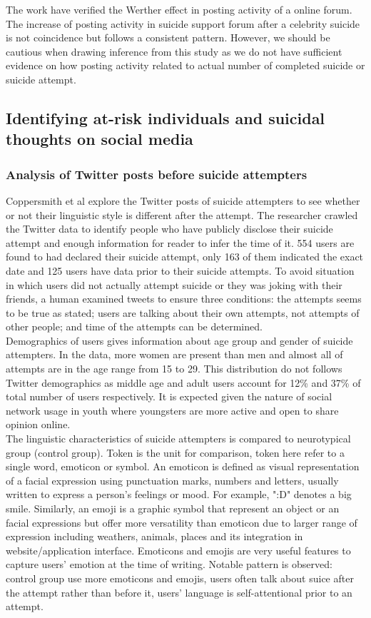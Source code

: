 The work have verified the Werther effect in posting activity of a online forum. The increase of posting activity in suicide support forum after a celebrity suicide is not coincidence but follows a consistent pattern. However, we should be cautious when drawing inference from this study as we do not have sufficient evidence on how posting activity related to actual number of completed suicide or suicide attempt.\\

\subsection{Identifying at-risk individuals and suicidal thoughts on social media}
\subsubsection*{Analysis of Twitter posts before suicide attempters}
Coppersmith et al \cite{Coppersmith2016} explore the Twitter posts of suicide attempters to see whether or not their linguistic style is different after the attempt. The researcher crawled the Twitter data to identify people who have publicly disclose their suicide attempt and enough information for reader to infer the time of it. 554 users are found to had declared their suicide attempt, only 163 of them indicated the exact date and 125 users have data prior to their suicide attempts. To avoid situation in which users did not actually attempt suicide or they was joking with their friends, a human examined tweets to ensure three conditions: the attempts seems to be true as stated; users are talking about their own attempts, not attempts of other people; and time of the attempts can be determined.\\
Demographics of users gives information about age group and gender of suicide attempters. In the data, more women are present than men and almost all of attempts are in the age range from 15 to 29. This distribution do not follows Twitter demographics as middle age and adult users account for 12\% and 37\% of total number of users respectively. It is expected given the nature of social network usage in youth where youngsters are more active and open to share opinion online.\\
The linguistic characteristics of suicide attempters is compared to neurotypical group (control group). Token is the unit for comparison, token here refer to a single word, emoticon or symbol. An emoticon is defined as visual representation of a facial expression using punctuation marks, numbers and letters, usually written to express a person's feelings or mood. For example, ":D" denotes a big smile. Similarly, an emoji is a graphic symbol that represent an object or an facial expressions but offer more versatility than emoticon due to larger range of expression including weathers, animals, places and its integration in website/application interface. Emoticons and emojis are very useful features to capture users' emotion at the time of writing. Notable pattern is observed: control group use more emoticons and emojis, users often talk about suice after the attempt rather than before it, users' language is self-attentional prior to an attempt.\\
